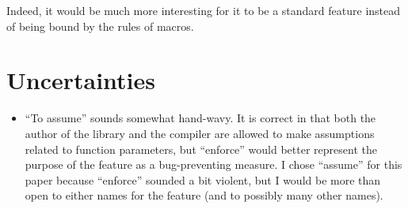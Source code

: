 \documentclass[a4paper, 12pt]{article}
\begin{document}
Indeed, it would be much more interesting for it to be a standard feature
instead of being bound by the rules of macros.
\section{Uncertainties}
\label{sec:org1c30466}
\begin{itemize}
\item ``To assume'' sounds somewhat hand-wavy.  It is correct in that both the author of
the library and the compiler are allowed to make assumptions related to function parameters,
but ``enforce'' would better represent the purpose of the feature as a bug-preventing
measure.  I chose ``assume'' for this paper because ``enforce'' sounded a bit violent,
but I would be more than open to either names for the feature (and to possibly many
other names).
\end{itemize}
\end{document}
